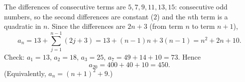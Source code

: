 The differences of consecutive terms are $5,7,9,11,13,15$: consecutive odd numbers, so the second differences are constant ($2$) and the $n$th term is a quadratic in $n$. Since the differences are $2n+3$ (from term $n$ to term $n+1$),
\[
a_n=13+\sum_{j=1}^{n-1}(2j+3)=13+(n-1)n+3(n-1)=n^2+2n+10 .
\]
Check: $a_1=13$, $a_2=18$, $a_3=25$, $a_7=49+14+10=73$. Hence
\[
a_{20}=400+40+10=\boxed{450}.
\]
(Equivalently, $a_n=(n+1)^2+9$.)
